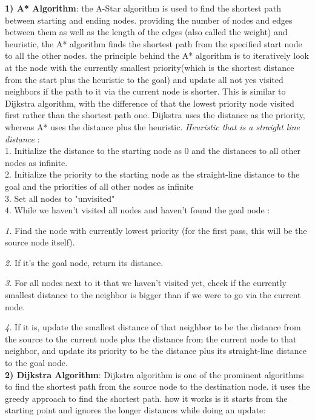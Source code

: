 \documentclass[12pt]{article}
\begin{document}
\textbf{1) A* Algorithm}: the A-Star algorithm is used to find the shortest path between starting and ending nodes. providing the number of nodes and edges between them as well as the length of the edges (also called the weight) and heuristic, the A* algorithm finds the shortest path from the specified start node to all the other nodes. 
the principle behind the A* algorithm is to iteratively look at the node with the currently smallest priority(which is the shortest distance from the start plus the heuristic to the goal) and update all not yes visited neighbors if the path to it via the current node is shorter. This is similar to Dijkstra algorithm, with the difference of that the lowest priority node 
visited first rather than the shortest path one. Dijkstra uses the distance as the priority, whereas A* uses the distance plus the heuristic.
\textit{Heuristic that is a straight line distance} : \\
1. Initialize the distance to the starting node as 0 and the distances to all other nodes as infinite. \\
2. Initialize the priority to the starting node as the straight-line distance to the goal and the priorities of all other nodes as infinite \\
3. Set all nodes to "unvisited" \\
4. While we haven't visited all nodes and haven't found the goal node :

\textit{1.} Find the node with currently lowest priority (for the first pass, this will be the source node itself).

\textit{2.} If it's the goal node, return its distance.

\textit{3.} For all nodes next to it that we haven't visited yet, check if the currently smallest distance to the neighbor is bigger than if we were to go via the current node.

\textit{4.} If it is, update the smallest distance of that neighbor to be the distance from the source to the current node plus the distance from the current node to that neighbor, and update its priority to be the
distance plus its straight-line distance to the goal node. \\

\textbf{2) Dijkstra Algorithm}: Dijkstra algorithm is one of the prominent algorithms to find the shortest path from the source node to the destination node. it uses the greedy approach to find the shortest path. 
how it works is it starts from the starting point and ignores the longer distances while doing an update: 
\end{document}
